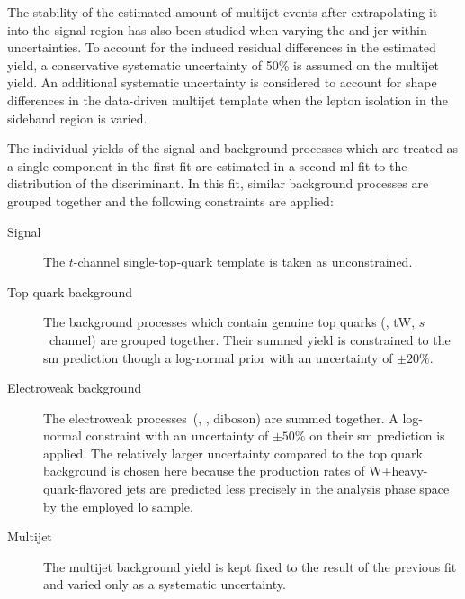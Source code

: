 
The stability of the estimated amount of multijet events after extrapolating it into the signal region has also been studied when varying the  and \acrlong{jer} within uncertainties. To account for the induced residual differences in the estimated yield, a conservative systematic uncertainty of 50\% is assumed on the multijet yield. An additional systematic uncertainty is considered to account for shape differences in the data-driven multijet template when the lepton isolation in the sideband region is varied.

The individual yields of the signal and background processes which are treated as a single component in the first fit are estimated in a second \gls{ml} fit to the distribution of the \bdttch discriminant. In this fit, similar background processes are grouped together and the following constraints are applied:

\begin{description}
\item[Signal] The $t$-channel single-top-quark template is taken as unconstrained.
\item[Top quark background] The background processes which contain genuine top quarks (\ttbar, tW, $s$~channel) are grouped together. Their summed yield is constrained to the \gls{sm} prediction though a log-normal prior with an uncertainty of $\pm20\%$.
\item[Electroweak background] The electroweak processes~(\wjets, \zjets, diboson) are summed together. A log-normal constraint with an uncertainty of $\pm50\%$ on their \gls{sm} prediction is applied. The relatively larger uncertainty compared to the top quark background is chosen here because the production rates of W+heavy-quark-flavored jets are predicted less precisely in the analysis phase space by the employed \wjets \gls{lo} \MG sample.
\item[Multijet] The multijet background yield is kept fixed to the result of the previous fit and varied only as a systematic uncertainty.
\end{description}

